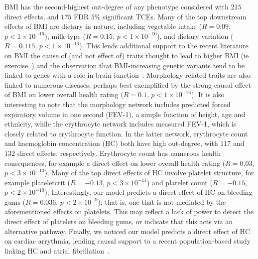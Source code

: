 \documentclass{article}
\begin{document}
BMI has the second-highest out-degree of any phenotype considered with
$215$ direct effects, and $175$ FDR $5\%$ significant TCEs.
Many of the top downstream effects of BMI are dietary
in nature, including vegetable intake ($R = 0.09$, $p < 1\times 10^{-16}$),
milk-type ($R = 0.15$, $p < 1\times 10^{-16}$), and dietary variation ($R = 0.115$, $p < 1\times 10^{-16}$).
This lends additional support to the recent literature on BMI the cause of (and not effect of)
traits thought to lead to higher BMI (ie exercise~\cite{Richmond2014}) and the observation that
BMI-increasing genetic variants tend to be linked to genes with a role in brain
function~\cite{Locke2015,Zhu2016,Ndiaye2020}. Morphology-related traits are also linked
to numerous diseases, perhaps best exemplified by the strong causal effect of BMI on lower overall
health rating ($R = 0.1$, $p < 1 \times 10^{-16}$). It is also interesting to note that the
morphology network includes predicted forced expiratory volume in
one second (FEV-1), a simple function of height, age and ethnicity,
while the erythrocyte network includes measured FEV-1, which is closely related to
erythrocyte function. In the latter network, erythrocyte count and haemoglobin concentration (HC)
both have high out-degree, with $117$ and $132$ direct effects, respectively.
Erythrocyte count has numerous health consequences,
for example a direct effect on lower overall health rating ($R = 0.03$, $p < 3 \times 10^{-10}$).
Many of the top direct effects of HC involve platelet structure,
for example plateletcrit ($R = -0.13$, $p < 3 \times 10^{-11}$) and platelet count
($R = -0.15$, $p < 2 \times 10^{-10}$). Interestingly, our model predicts a direct effect of
HC on bleeding gums ($R = 0.036$, $p < 2 \times 10^{-9}$); that is, one
that is not mediated by the aforementioned effects on platelets. This may reflect a lack of power to detect
the direct effect of platelets on bleeding gums, or indicate that this acts via an alternative pathway.
Finally, we noticed our model predicts a direct effect of HC on cardiac arrythmia, lending causal
support to a recent population-based study linking HC and atrial fibrillation~\cite{Lim2020}.
\end{document}

